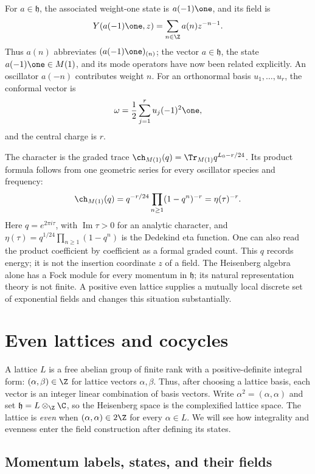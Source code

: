 For $a\in\mathfrak h$, the associated weight-one state is
$a(-1)\one$, and its field is
\[
 Y(a(-1)\one,z)=\sum_{n\in\Z}a(n)z^{-n-1}.
\]
Thus $a(n)$ abbreviates $(a(-1)\one)_{(n)}$; the vector
$a\in\mathfrak h$, the state $a(-1)\one\in M(1)$, and its
mode operators have now been related explicitly.
An oscillator $a(-n)$ contributes weight $n$. For an orthonormal
basis $u_1,\ldots,u_r$, the conformal vector is
\[
 \omega=\frac12\sum_{j=1}^r u_j(-1)^2\one,
\]
and the central charge is $r$.

The character is the graded trace
$\ch_{M(1)}(q)=\Tr_{M(1)}q^{L_0-r/24}$.
Its product formula follows from one geometric series for every
oscillator species and frequency:
\begin{equation}
 \ch_{M(1)}(q)
 =q^{-r/24}\prod_{n\ge1}(1-q^n)^{-r}
 =\eta(\tau)^{-r}.
 \label{eq:voa-oscillator-character}
\end{equation}
Here $q=e^{2\pi i\tau}$, with $\operatorname{Im}\tau>0$ for an
analytic character, and
$\eta(\tau)=q^{1/24}\prod_{n\ge1}(1-q^n)$ is the Dedekind eta
function. One can also read the product coefficient by coefficient
as a formal graded count. This $q$ records energy; it is not the
insertion coordinate $z$ of a field.
The Heisenberg algebra alone has a Fock module for every
momentum in $\mathfrak h$; its natural representation theory is not
finite. A positive even lattice supplies a mutually local discrete
set of exponential fields and changes this situation substantially.

\section{Even lattices and cocycles}

A lattice $L$ is a free abelian group of finite rank with a
positive-definite integral form: $(\alpha,\beta)\in\Z$ for lattice
vectors $\alpha,\beta$. Thus, after choosing a lattice basis, each
vector is an integer linear combination of basis vectors. Write
$\alpha^2=(\alpha,\alpha)$ and set
$\mathfrak h=L\otimes_{\Z}\C$, so the Heisenberg space is the
complexified lattice space.
The lattice is \emph{even} when
$(\alpha,\alpha)\in2\Z$ for every $\alpha\in L$.
We will see how integrality and evenness enter the field construction
after defining its states.

\subsection{Momentum labels, states, and their fields}

